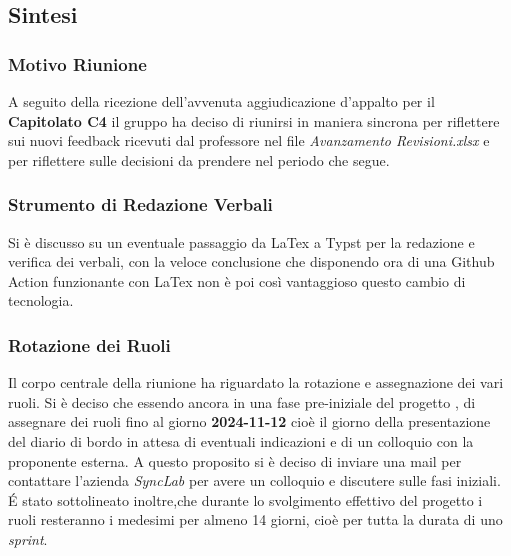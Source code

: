 \documentclass[10pt]{article}
\begin{document}
\subsection{Sintesi}
\subsubsection{Motivo Riunione}
A seguito della ricezione dell'avvenuta aggiudicazione d'appalto per il \textbf{Capitolato C4} il gruppo ha deciso di riunirsi in maniera sincrona per riflettere sui nuovi feedback ricevuti dal professore nel file \textit{Avanzamento Revisioni.xlsx} e per riflettere sulle decisioni da prendere nel periodo che segue.
\subsubsection{Strumento di Redazione Verbali}
Si è discusso su un eventuale passaggio da LaTex a Typst per la redazione e verifica dei verbali, con la veloce conclusione che disponendo ora di una Github Action funzionante con LaTex non è poi così vantaggioso questo cambio di tecnologia.
\subsubsection{Rotazione dei Ruoli}
Il corpo centrale della riunione ha riguardato la rotazione e assegnazione dei vari ruoli. Si è deciso che essendo ancora in una fase pre-iniziale del progetto , di assegnare dei ruoli fino al giorno \textbf{2024-11-12} cioè il giorno della presentazione del diario di bordo in attesa di eventuali indicazioni e di un colloquio con la proponente esterna. A questo proposito si è deciso di inviare una mail per contattare l'azienda \textit{SyncLab} per avere un colloquio e discutere sulle fasi iniziali. É stato sottolineato inoltre,che durante lo svolgimento effettivo del progetto i ruoli resteranno i medesimi per almeno 14 giorni, cioè per tutta la durata di uno \textit{sprint}.
\end{document}
